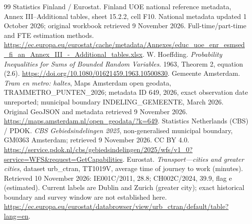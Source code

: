 \begin{thebibliography}{99}
 Statistics Finland / Eurostat. Finland UOE national
reference metadata, Annex III--Additional tables, sheet 15.2.2, cell F10.
National metadata updated 1 October 2026; original workbook retrieved
9 November 2026. Full-time/part-time and FTE estimation methods.
\url{https://ec.europa.eu/eurostat/cache/metadata/Annexes/educ_uoe_enr_esmsed_fi_an_Annex_III_-_Additional_tables.xlsx}.
 W. Hoeffding.
\textit{Probability Inequalities for Sums of Bounded Random Variables}.
1963, Theorem 2, equation (2.6).
\url{https://doi.org/10.1080/01621459.1963.10500830}.
 Gemeente Amsterdam.
\textit{Tram en metro: haltes}, Maps Amsterdam open geodata,
TRAMMETRO\_PUNTEN\_2026; metadata ID 649, 2026, exact observation date unreported; municipal boundary
INDELING\_GEMEENTE, March 2026.
Original GeoJSON and metadata retrieved 9 November 2026.
\url{https://maps.amsterdam.nl/open_geodata/?k=649}.
 Statistics Netherlands (CBS) / PDOK.
\textit{CBS Gebiedsindelingen 2025}, non-generalised municipal boundary,
GM0363 Amsterdam; retrieved 9 November 2026. CC BY 4.0.
\url{https://service.pdok.nl/cbs/gebiedsindelingen/2025/wfs/v1_0?service=WFS&request=GetCapabilities}.
 Eurostat.
\textit{Transport---cities and greater cities}, dataset urb\_ctran,
TT1019V, average time of journey to work (minutes).
Retrieved 10 November 2026: IE001C/2011, 28.8; CH002C/2024, 39.9,
flag e (estimated). Current labels are Dublin and Zurich (greater city);
exact historical boundary and survey window are not established here.
\url{https://ec.europa.eu/eurostat/databrowser/view/urb_ctran/default/table?lang=en}.
\end{thebibliography}
